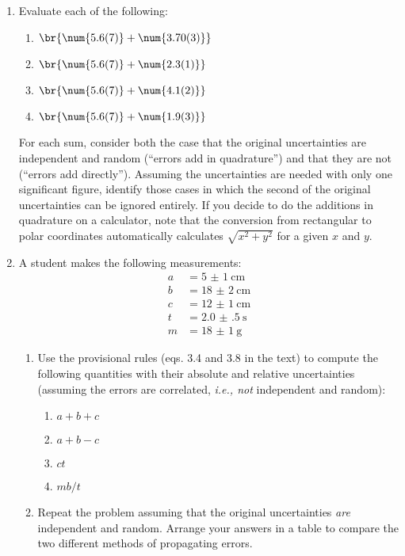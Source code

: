 \documentclass[nobib,nofonts,nols,nohyper]{tufte-handout}
\begin{document}
\begin{enumerate}
	\item{} Evaluate each of the following:
	\begin{enumerate}
		\item \( \br{\num{5.6(7)} + \num{3.70(3)}} \)
		
		\item \( \br{\num{5.6(7)} + \num{2.3(1)}} \)
		
		\item \( \br{\num{5.6(7)} + \num{4.1(2)}} \)
		
		\item \( \br{\num{5.6(7)} + \num{1.9(3)}} \)
	\end{enumerate}
	For each sum, consider both the case that the original uncertainties are independent and random (``errors add in quadrature'') and that they are not (``errors add directly''). 
	Assuming the uncertainties are needed with only one significant figure, identify those cases in which the second of the original uncertainties can be ignored entirely. 
	If you decide to do the additions in quadrature on a calculator, note that the conversion from rectangular to polar coordinates automatically calculates \( \sqrt{x^2 + y^2} \) for a given \( x \) and \( y \). 
	
	\item A student makes the following measurements:
		\begin{align*}
			a &= \SI{5(1)}{\cm} \\
			b &= \SI{18(2)}{\cm} \\
			c &= \SI{12(1)}{\cm} \\
			t &= \SI{2.0(5)}{\s} \\
			m &= \SI{18(1)}{\g} 
		\end{align*}
	\begin{enumerate}
		\item Use the provisional rules (eqs. 3.4 and 3.8 in the text) to compute the following quantities with their absolute and relative uncertainties (assuming the errors are correlated, \emph{i.e., not} independent and random):
		\begin{enumerate}
			\item \( a + b + c \)
			\item \( a + b - c \)
			\item \( ct \)
			\item \( mb/t \)
		\end{enumerate}
	
		\item Repeat the problem assuming that the original uncertainties \emph{are} independent and random. 
		Arrange your answers in a table to compare the two different methods of propagating errors. 
	\end{enumerate}
	

\end{enumerate}
\end{document}
